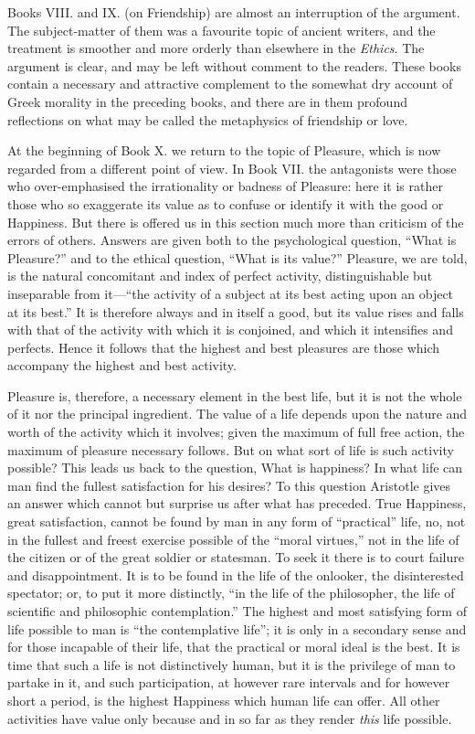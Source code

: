 Books VIII. and IX. (on Friendship) are almost an interruption of the argument.
The subject-matter of them was a favourite topic of ancient writers, and the
treatment is smoother and more orderly than elsewhere in the \emph{Ethics}. The
argument is clear, and may be left without comment to the readers. These books
contain a necessary and attractive complement to the somewhat dry account of
Greek morality in the preceding books, and there are in them profound
reflections on what may be called the metaphysics of friendship or love.

At the beginning of Book X. we return to the topic of Pleasure, which is now
regarded from a different point of view. In Book VII. the antagonists were
those who over-emphasised the irrationality or badness of Pleasure: here it is
rather those who so exaggerate its value as to confuse or identify it with the
good or Happiness. But there is offered us in this section much more than
criticism of the errors of others. Answers are given both to the psychological
question, “What is Pleasure?” and to the ethical question,
“What is its value?” Pleasure, we are told, is the natural
concomitant and index of perfect activity, distinguishable but inseparable from
it—“the activity of a subject at its best acting upon an object at
its best.” It is therefore always and in itself a good, but its value
rises and falls with that of the activity with which it is conjoined, and which
it intensifies and perfects. Hence it follows that the highest and best
pleasures are those which accompany the highest and best activity.

Pleasure is, therefore, a necessary element in the best life, but it is not the
whole of it nor the principal ingredient. The value of a life depends upon the
nature and worth of the activity which it involves; given the maximum of full
free action, the maximum of pleasure necessary follows. But on what sort of
life is such activity possible? This leads us back to the question, What is
happiness? In what life can man find the fullest satisfaction for his desires?
To this question Aristotle gives an answer which cannot but surprise us after
what has preceded. True Happiness, great satisfaction, cannot be found by man
in any form of “practical” life, no, not in the fullest and freest
exercise possible of the “moral virtues,” not in the life of the
citizen or of the great soldier or statesman. To seek it there is to court
failure and disappointment. It is to be found in the life of the onlooker, the
disinterested spectator; or, to put it more distinctly, “in the life of
the philosopher, the life of scientific and philosophic contemplation.”
The highest and most satisfying form of life possible to man is “the
contemplative life”; it is only in a secondary sense and for those
incapable of their life, that the practical or moral ideal is the best. It is
time that such a life is not distinctively human, but it is the privilege of
man to partake in it, and such participation, at however rare intervals and for
however short a period, is the highest Happiness which human life can offer.
All other activities have value only because and in so far as they render
\emph{this} life possible.

